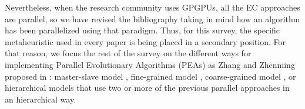 \documentclass{article}
\begin{document}

Nevertheless, when the research community uses GPGPUs, all the EC approaches are parallel, so we have revised the bibliography taking in mind how an algorithm has been parallelized using that paradigm. Thus, for this survey, the specific metaheuristic used in every paper is being placed in a secondary position.  
For that reason, we focus the rest of the survey on the different ways for implementing Parallel Evolutionary Algorithms (PEAs) as Zhang and Zhenming proposed in \cite{ZhangImplementationMasterSlave}: master-slave model \cite{man-leung-wong-parallel-2005}, fine-grained model \cite{jian_ming_li_efficient_2007}, coarse-grained model \cite{Maitre:2009:CGP:1569901.1570089}, %
or hierarchical models  \cite{DBLP:conf/gecco/PospichalMOSJ11} that use two or more of the previous parallel approaches in an hierarchical way. 
\end{document}
